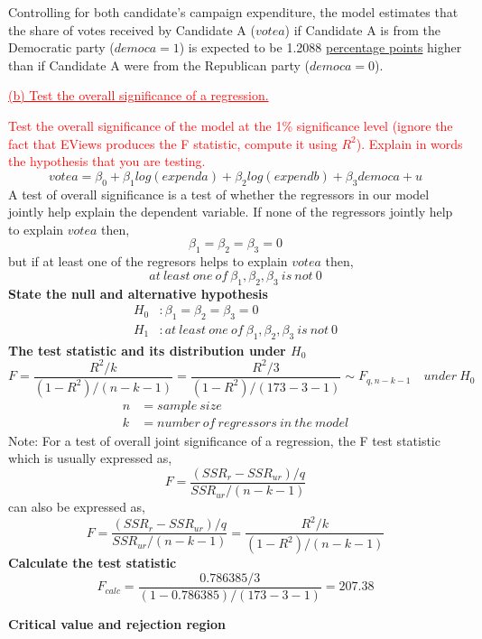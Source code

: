\documentclass[12pt]{report}
\begin{document}
\noindent Controlling for both candidate's campaign expenditure, the model estimates that the share of votes received by Candidate A ($votea$) if Candidate A is from the Democratic party ($democa = 1$) is expected to be 1.2088 \uline{percentage points} higher than if Candidate A were from the Republican party ($democa=0$).

\newpage
\noindent \textcolor{red}
{
	\uline{(b) Test the overall significance of a regression.}
}

\noindent \textcolor{red}
{
	Test the overall significance of the model at the 1\% significance level (ignore the fact that EViews produces the F statistic, compute it using $R^2$). Explain in words the hypothesis that you are testing.
}
$$votea = \beta_0 + \beta_1log(expenda) + \beta_2log(expendb) + \beta_3democa + u $$
\noindent A test of overall significance is a test of whether the regressors in our model jointly help explain the dependent variable. If none of the regressors jointly help to explain $votea$ then,
$$\beta_1 = \beta_2 = \beta_3 = 0$$
but if at least one of the regresors helps to explain $votea$ then,
$$at\ least\ one\ of\ \beta_1, \beta_2, \beta_3\ is\ not\ 0$$
\noindent \textbf{State the null and alternative hypothesis}
\begin{align*}
	H_0&: \beta_1 = \beta_2 = \beta_3 = 0 \\
	H_1&: at\ least\ one\ of\ \beta_1, \beta_2, \beta_3\ is\ not\ 0
\end{align*}
\noindent \textbf{The test statistic and its distribution under $H_0$}
$$F = \dfrac{R^{2}/k}{(1-R^2)/(n-k-1)} = \dfrac{R^{2}/3}{(1-R^2)/(173-3-1)} \sim F_{q,n-k-1} \quad under\ H_0$$
\begin{align*}
	n &= sample\ size \\
	k &= number\ of\ regressors\ in\ the\ model  
\end{align*}
\noindent Note: For a test of overall joint significance of a regression, the F test statistic which is usually expressed as, $$F = \dfrac{(SSR_r - SSR_{ur})/q}{SSR_{ur}/(n-k-1)}$$ can also be expressed as,
$$F = \dfrac{(SSR_r - SSR_{ur})/q}{SSR_{ur}/(n-k-1)} = \dfrac{R^{2}/k}{(1-R^2)/(n-k-1)}$$
\noindent \textbf{Calculate the test statistic}
$$F_{calc} = \dfrac{0.786385/3}{(1-0.786385)/(173-3-1)} = 207.38 $$
\begin{figure}[H]
	\centering
\end{figure}
\vspace{-\baselineskip}
\noindent \textbf{Critical value and rejection region}
\end{document}

